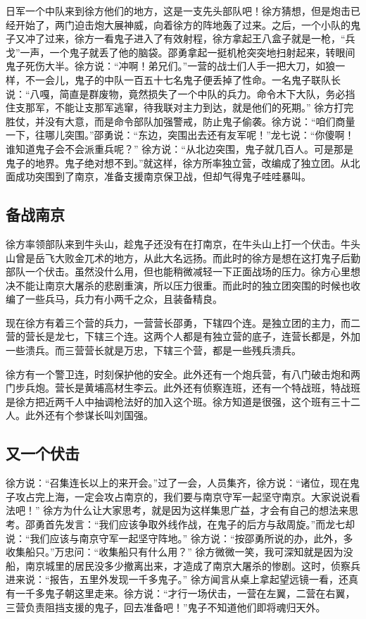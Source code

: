 \documentclass[UTF8,a4paper,titlepage,twoside,10.5pt]{article}
\begin{document}
日军一个中队来到徐方他们的地方，这是一支先头部队吧！徐方猜想，但是炮击已经开始了，两门迫击炮大展神威，向着徐方的阵地轰了过来。之后，一个小队的鬼子又冲了过来，徐方一看鬼子进入了有效射程，徐方拿起王八盒子就是一枪，“兵戈”一声，一个鬼子就丢了他的脑袋。邵勇拿起一挺机枪突突地扫射起来，转眼间鬼子死伤大半。徐方说：“冲啊！弟兄们。”一营的战士们人手一把大刀，如狼一样，不一会儿，鬼子的中队一百五十七名鬼子便丢掉了性命。一名鬼子联队长说：“八嘎，简直是群废物，竟然损失了一个中队的兵力。命令木下大队，务必挡住支那军，不能让支那军逃窜，待我联对主力到达，就是他们的死期。” 徐方打完胜仗，并没有大意，而是命令部队加强警戒，防止鬼子偷袭。徐方说：“咱们商量一下，往哪儿突围。”邵勇说：“东边，突围出去还有友军呢！”龙七说：“你傻啊！谁知道鬼子会不会派重兵呢？” 徐方说：“从北边突围，鬼子就几百人。可是那是鬼子的地界。鬼子绝对想不到。”就这样，徐方所率独立营，改编成了独立团。从北面成功突围到了南京，准备支援南京保卫战，但却气得鬼子哇哇暴叫。

\subsection{备战南京}
\label{sec:org9cc9b61}

徐方率领部队来到牛头山，趁鬼子还没有在打南京，在牛头山上打一个伏击。牛头山曾是岳飞大败金兀术的地方，从此大名远扬。而此时的徐方是想在这打鬼子后勤部队一个伏击。虽然没什么用，但也能稍微减轻一下正面战场的压力。徐方心里想决不能让南京大屠杀的悲剧重演，所以压力很重。而此时的独立团突围的时候也收编了一些兵马，兵力有小两千之众，且装备精良。

现在徐方有着三个营的兵力，一营营长邵勇，下辖四个连。是独立团的主力，而二营的营长是龙七，下辖三个连。这两个人都是有独立营的底子，连营长都是，外加一些溃兵。而三营营长就是万忠，下辖三个营，都是一些残兵溃兵。

徐方有一个警卫连，时刻保护他的安全。此外还有一个炮兵营，有八门破击炮和两门步兵炮。营长是黄埔高材生李云。此外还有侦察连班，还有一个特战班，特战班是徐方把近两千人中抽调枪法好的加入这个班。徐方知道是很强，这个班有三十二人。此外还有个参谋长叫刘国强。

\subsection{又一个伏击}
\label{sec:org4f49b06}

徐方说：“召集连长以上的来开会。”过了一会，人员集齐，徐方说：“诸位，现在鬼子攻占完上海，一定会攻占南京的，我们要与南京守军一起坚守南京。大家说说看法吧！” 徐方为什么让大家思考，就是因为这样集思广益，才会有自己的想法来思考。邵勇首先发言：“我们应该争取外线作战，在鬼子的后方与敌周旋。”而龙七却说：“我们应该与南京守军一起坚守阵地。” 徐方说：“按邵勇所说的办，此外，多收集船只。”万忠问：“收集船只有什么用？” 徐方微微一笑，我可深知就是因为没船，南京城里的居民没多少撤离出来，才造成了南京大屠杀的惨剧。这时，侦察兵进来说：“报告，五里外发现一千多鬼子。” 徐方闻言从桌上拿起望远镜一看，还真有一千多鬼子朝这里走来。徐方说：“才行一场伏击，一营在左翼，二营在右翼，三营负责阻挡支援的鬼子，回去准备吧！”鬼子不知道他们即将魂归天外。
\end{document}
